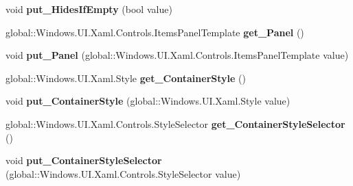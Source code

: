 \begin{DoxyCompactItemize}
\item 
\mbox{\label{interface_windows_1_1_u_i_1_1_xaml_1_1_controls_1_1_i_group_style_aa1cde0010b3374a26237b4f39bcf3370}} 
void {\bfseries put\+\_\+\+Hides\+If\+Empty} (bool value)
\item 
\mbox{\label{interface_windows_1_1_u_i_1_1_xaml_1_1_controls_1_1_i_group_style_a0c9c3cde89c2eb82c05931ac6a601a16}} 
global\+::\+Windows.\+U\+I.\+Xaml.\+Controls.\+Items\+Panel\+Template {\bfseries get\+\_\+\+Panel} ()
\item 
\mbox{\label{interface_windows_1_1_u_i_1_1_xaml_1_1_controls_1_1_i_group_style_a54431a2fb424c8ee66764a90f1eb3a72}} 
void {\bfseries put\+\_\+\+Panel} (global\+::\+Windows.\+U\+I.\+Xaml.\+Controls.\+Items\+Panel\+Template value)
\item 
\mbox{\label{interface_windows_1_1_u_i_1_1_xaml_1_1_controls_1_1_i_group_style_af3ec155955e17dff84857535074042f7}} 
global\+::\+Windows.\+U\+I.\+Xaml.\+Style {\bfseries get\+\_\+\+Container\+Style} ()
\item 
\mbox{\label{interface_windows_1_1_u_i_1_1_xaml_1_1_controls_1_1_i_group_style_af0d3f03b233d17bef1f3a1cf829ca1b7}} 
void {\bfseries put\+\_\+\+Container\+Style} (global\+::\+Windows.\+U\+I.\+Xaml.\+Style value)
\item 
\mbox{\label{interface_windows_1_1_u_i_1_1_xaml_1_1_controls_1_1_i_group_style_a56b3461ac75ac985ef5d7d81a6c6a9cf}} 
global\+::\+Windows.\+U\+I.\+Xaml.\+Controls.\+Style\+Selector {\bfseries get\+\_\+\+Container\+Style\+Selector} ()
\item 
\mbox{\label{interface_windows_1_1_u_i_1_1_xaml_1_1_controls_1_1_i_group_style_a02ae70e78fa1f73a90c99f25ffb93918}} 
void {\bfseries put\+\_\+\+Container\+Style\+Selector} (global\+::\+Windows.\+U\+I.\+Xaml.\+Controls.\+Style\+Selector value)

\end{DoxyCompactItemize}
